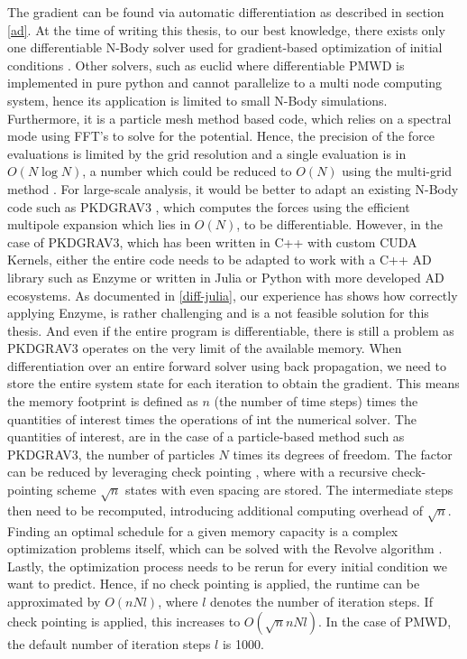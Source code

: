 \documentclass{article}
\begin{document}
The gradient can be found via automatic differentiation as described in section \ref{ad}. At the time of writing this thesis, to our best knowledge, there exists only one differentiable N-Body solver used for gradient-based optimization of initial conditions \citep{li2024differentiable}. Other solvers, such as euclid where differentiable PMWD is implemented in pure python and cannot parallelize to a multi node computing system, hence its application is limited to small N-Body simulations. Furthermore, it is a particle mesh method based code, which relies on a spectral mode using FFT's to solve for the potential. Hence, the precision of the force evaluations is limited by the grid resolution and a single evaluation is in $O(N \log N)$, a number which could be reduced to $O(N)$ using the multi-grid method \citep{mccormick1987multigrid}. For large-scale analysis, it would be better to adapt an existing N-Body code such as PKDGRAV3 \citep{potter2017pkdgrav3}, which computes the forces using the efficient multipole expansion which lies in $O(N)$, to be  differentiable. However, in the case of PKDGRAV3, which has been written in C++ with custom CUDA Kernels, either the entire code needs to be adapted to work with a C++ AD library such as Enzyme or written in Julia or Python with more developed AD ecosystems. As documented in \ref{diff-julia}, our experience has shows how correctly applying Enzyme, is rather challenging and is a not feasible solution for this thesis. And even if the entire program is differentiable, there is still a problem as PKDGRAV3 operates on the very limit of the available memory. When differentiation over an entire forward solver using back propagation, we need to store the entire system state for each iteration to obtain the gradient. This means the memory footprint is defined as $n$ (the number of time steps) times the quantities of interest times the operations of int the numerical solver. The quantities of interest, are in the case of a particle-based method such as PKDGRAV3, the number of particles $N$ times its degrees of freedom. The factor can be reduced by leveraging check pointing \citep{wang2009minimal}, where with a recursive check-pointing scheme $\sqrt n$ states with even spacing are stored. The intermediate steps then need to be recomputed, introducing additional computing overhead of  $\sqrt n$. Finding an optimal schedule for a given memory capacity is a complex optimization problems itself, which can be solved with the Revolve algorithm \citep{griewank2000algorithm}. Lastly, the optimization process needs to be rerun for every initial condition we want to predict. Hence, if no check pointing is applied, the runtime can be approximated by $O(n N l)$, where $l$ denotes the number of iteration steps. If check pointing is applied, this increases to $O(\sqrt{n} n N l)$. In the case of PMWD, the default number of iteration steps $l$ is 1000.
\end{document}
